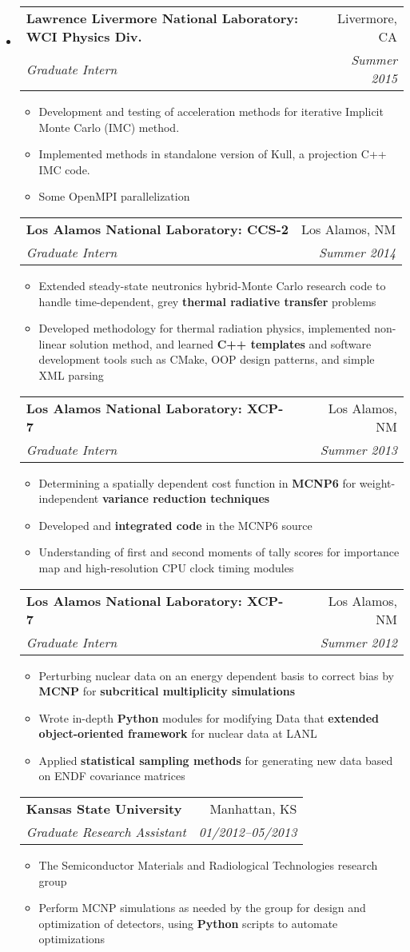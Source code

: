 \documentclass[letterpaper,11pt]{article}
\makeatletter
\newcommand{\resitem}[1]{\item #1 \vspace{-2pt}}
\newcommand{\ressubheading}[4]{
\begin{tabular*}{6.5in}{l@{\cftdotfill{\cftsecdotsep}\extracolsep{\fill}}r}
		\textbf{\hspace{-0.341in}#1} & #2 \\
		\textit{#3} & \textit{#4} \\
\end{tabular*}\vspace{-6pt}}
\makeatother
\begin{document}
\begin{itemize}
\item[]
\ressubheading{Lawrence Livermore National Laboratory: WCI Physics Div.}{Livermore, CA}{Graduate Intern}{Summer 2015}
	\begin{itemize}
	\resitem{Development and testing of acceleration methods for iterative Implicit Monte Carlo (IMC) method.}
	\resitem{Implemented methods in standalone version of Kull, a projection C++ IMC code.}
	\resitem{Some OpenMPI parallelization}
	\end{itemize}
\ressubheading{Los Alamos National Laboratory: CCS-2}{Los Alamos, NM}{Graduate Intern}{Summer 2014}
	\begin{itemize}
	\resitem{Extended steady-state neutronics hybrid-Monte Carlo research code to handle time-dependent, grey \textbf{thermal radiative transfer} problems}
	\resitem{Developed methodology for thermal radiation physics, implemented non-linear solution method, and learned \textbf{C++ templates} and software development tools such as CMake, OOP design patterns, and simple XML parsing}
	\end{itemize}
 \ressubheading{Los Alamos National Laboratory: XCP-7}{Los Alamos, NM}{Graduate Intern}{Summer 2013}
	\begin{itemize}
	\resitem{Determining a spatially dependent cost function in \textbf{MCNP6} for weight-independent \textbf{variance reduction techniques}}
	\resitem{Developed and \textbf{integrated code} in the MCNP6 source}
	\resitem{Understanding of first and second moments of tally scores for importance map and high-resolution CPU clock timing modules}
	\end{itemize}
\ressubheading{Los Alamos National Laboratory: XCP-7}{Los Alamos, NM}{Graduate Intern}{Summer 2012}
	\begin{itemize}
	\resitem{Perturbing nuclear data on an energy dependent basis to correct bias by \textbf{MCNP} for \textbf{subcritical multiplicity simulations}}
	\resitem{Wrote in-depth \textbf{Python} modules for modifying Data that \textbf{extended object-oriented framework} for nuclear data at LANL}
	\resitem{Applied \textbf{statistical sampling methods} for generating new data based on ENDF covariance matrices}
	\end{itemize}
\ressubheading{Kansas State University}{Manhattan, KS}{Graduate Research Assistant}{01/2012--05/2013}
	\begin{itemize}
	\resitem{The Semiconductor Materials and Radiological Technologies research group}
	\resitem{Perform MCNP simulations as needed by the group for design and optimization of detectors, using \textbf{Python} scripts to automate optimizations}

\end{itemize}
\end{itemize}
\end{document}
